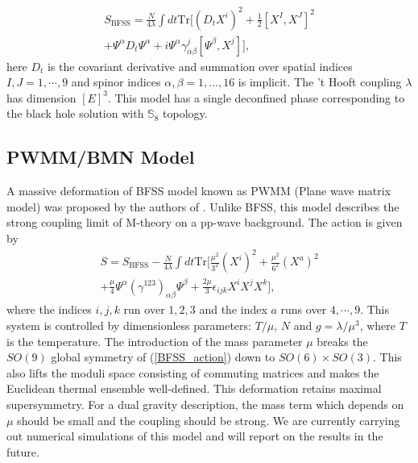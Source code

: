 \begin{align}
S_{\text{BFSS}} = \frac{N}{4\lambda} \int dt \mathrm{Tr} \Bigg[
  (D_t X^i)^2  + \frac{1}{2} \left[X^I,X^J\right]^2 \nonumber \\  +  \Psi^\alpha D_t \Psi^\alpha  
 + i \Psi^\alpha \gamma_{\alpha \beta}^j [\Psi^\beta,X^j] \Bigg],
\label{BFSS_action}
\end{align}
here $D_t$ is the covariant derivative and summation over spatial indices 
$I,J=1,\cdots,9$ and  spinor indices $\alpha,\beta=1,\dots,16$ is implicit. 
The 't Hooft coupling $\lambda$ has dimension $[E]^3$. 
This model has a single deconfined phase corresponding to the black hole solution with $\mathbb{S}_{8}$ topology. 




\subsection{PWMM/BMN Model}
A massive deformation of BFSS model known as 
PWMM (Plane wave matrix model) was proposed by the authors of \cite{Berenstein:2002jq}. 
Unlike BFSS, this model describes the strong coupling limit of M-theory on a pp-wave background. 
The action is given by
\begin{align}
S=S_{\text{BFSS}}-\frac{N}{4\lambda} \int dt \mathrm{Tr} \Bigg[
\frac{\mu^2}{ 3^2} ( X^i)^2 + \frac{\mu^2}{ 6^2} (X^a)^2 \nonumber \\ + \frac{\mu}{4}\Psi^\alpha \left(\gamma^{123}\right)_{\alpha \beta} \Psi^\beta 
+\frac{2\mu}{3} \epsilon_{ijk} X^iX^jX^k \Bigg] ,
\label{PWMM_action}
\end{align}
where the indices $i,j,k$ run over $1,2,3$ and the index $a$ runs over $4,\cdots,9$.
This system is controlled by dimensionless parameters: $T/\mu$, $N$ and $ g=\lambda/\mu^3$, where $T$ is the temperature.
The introduction of the mass parameter $\mu$ breaks the $SO(9)$ global symmetry of (\ref{BFSS_action}) down to $SO(6)\times SO(3)$. 
This also lifts the moduli space consisting of commuting matrices and makes the Euclidean thermal ensemble well-defined. 
This deformation retains maximal supersymmetry. For a dual gravity description, the mass term which depends on $\mu$ should be small
and the coupling should be strong. We are currently carrying out numerical simulations of this model and will report on the results in the future. 



